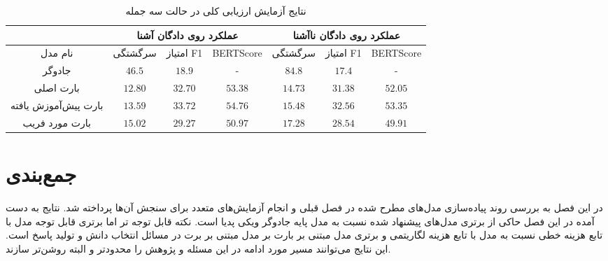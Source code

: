 \begin{table}[ht]
	\caption{نتایج آزمایش ارزیابی کلی در حالت سه جمله}
	\label{table:overall_trisentence}
	\begin{tabular}{|c|c|c|c|c|c|c|}
		\hline
		& \multicolumn{3}{c|}{عملکرد روی دادگان آشنا} & \multicolumn{3}{c|}{عملکرد روی دادگان نا‌آشنا} \\ \hline
		نام مدل              & سرگشتگی     & امتیاز F1     & BERTScore     & سرگشتگی      & امتیاز F1      & BERTScore      \\ \hline
		جادوگر               & $46.5$      & $18.9$        & -             & $84.8$       & $17.4$         & -              \\ \hline
		بارت اصلی            & $12.80$     & $32.70$       & $53.38$       & $14.73$      & $31.38$        & $52.05$        \\ \hline
		بارت پیش‌آموزش یافته & $13.59$     & $33.72$       & $54.76$       & $15.48$      & $32.56$        & $53.35$        \\ \hline
		بارت مورد فریب       & $15.02$     & $29.27$       & $50.97$       & $17.28$      & $28.54$        & $49.91$        \\ \hline
	\end{tabular}
\end{table}





\section{جمع‌بندی}
در این فصل به بررسی روند پیاده‌سازی مدل‌های مطرح شده در فصل قبلی و انجام آزمایش‌های متعدد برای سنجش آن‌ها پرداخته شد. نتایج به دست آمده در این فصل حاکی از برتری‌ مدل‌های پیشنهاد شده نسبت به مدل پایه جادوگر ویکی پدیا است. نکته قابل توجه تر اما برتری قابل توجه مدل‌ با تابع هزینه خطی نسبت به مدل با تابع هزینه لگاریتمی و برتری مدل مبتنی بر بارت بر مدل مبتنی بر برت در مسائل انتخاب دانش و تولید پاسخ است. این نتایج می‌توانند مسیر مورد ادامه در این مسئله و پژوهش را محدودتر و البته روشن‌تر سازند. 
